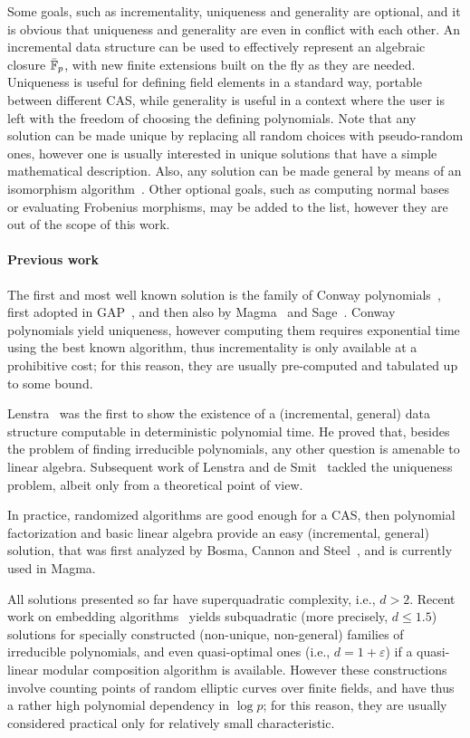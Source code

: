\documentclass[sigconf]{acmart}
\begin{document}
Some goals, such as incrementality, uniqueness and generality are
optional, and it is obvious that uniqueness and generality are even in
conflict with each other. %
An incremental data structure can be used to effectively represent an
algebraic closure $\bar{\mathbb{F}}_{p}$, with new finite extensions built on the
fly as they are needed. %
Uniqueness is useful for defining field elements in a standard way,
portable between different CAS, while generality is useful in a
context where the user is left with the freedom of choosing the
defining polynomials. %
Note that any solution can be made unique by replacing all random
choices with pseudo-random ones, however one is usually interested in
unique solutions that have a simple mathematical description. %
Also, any solution can be made general by means of an isomorphism
algorithm~\cite{LenstraJr91,Allombert02,brieulle2018computing,narayanan2016fast}. %
Other optional goals, such as computing normal bases or evaluating
Frobenius morphisms, may be added to the list, however they are out of
the scope of this work.

\paragraph{Previous work}
The first and most well known solution is the family of Conway
polynomials~\cite{Nickel1988,heath+loehr99}, first adopted in
GAP~\cite{GAP4}, and then also by Magma~\cite{MAGMA} and
Sage~\cite{Sage}. %
Conway polynomials yield uniqueness, however computing them requires
exponential time using the best known algorithm, thus incrementality is only available at a
prohibitive cost; for this reason, they are usually pre-computed and
tabulated up to some bound.

Lenstra~\cite{LenstraJr91} was the first to show the existence of a (incremental, general) data
structure computable in deterministic polynomial time. He proved that, besides the problem of
finding irreducible polynomials, any other question is amenable to
linear algebra. %
Subsequent work of Lenstra and de
Smit~\cite{lenstra+desmit08-stdmodels} tackled the uniqueness problem,
albeit only from a theoretical point of view. %

In practice, randomized algorithms are good enough for a CAS, then
polynomial factorization and basic linear algebra provide an easy
(incremental, general) solution, that was first analyzed by Bosma,
Cannon and Steel~\cite{bosma+cannon+steel97}, and is currently used in
Magma. %

All solutions presented so far have superquadratic complexity, i.e.,
$d>2$. %
Recent work on embedding algorithms~\cite{DoSc12,DeDoSc13,DeDoSc2014}
yields subquadratic (more precisely, $d\le 1.5$) solutions for
specially constructed (non-unique, non-general) families of
irreducible polynomials, and even quasi-optimal ones (i.e.,
$d=1+\varepsilon$) if a quasi-linear modular composition algorithm is
available. %
However these constructions involve counting points of random elliptic
curves over finite fields, and have thus a rather high polynomial
dependency in $\log p$; for this reason, they are usually considered
practical only for relatively small characteristic.
\end{document}
